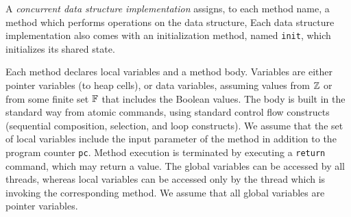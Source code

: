 




A {\em concurrent data structure implementation} assigns, to each
method name, a method which performs operations
%
on the data structure,
Each data structure implementation also comes with an initialization method,
named {\tt init}, which initializes its shared state.

%
Each method declares local variables
  and a method body.
%
Variables are either pointer variables
(to heap cells), 
or data variables, assuming values from ${\mathbb Z}$
or from some finite set $\mathbb{F}$ that includes the Boolean values.
%
%
The body is built in the standard way
from atomic commands, using standard control
flow constructs (sequential composition, selection, and loop constructs).
%
%
We assume that the set of local variables include the input
parameter of the method
in addition to the program counter {\tt pc}.
%
Method execution is terminated by executing a {\tt return} command,
which may return a value.
The global variables can be
accessed by all threads, whereas local variables can be accessed only
by the thread which is invoking the corresponding method.
%
We assume that all global variables are pointer variables.

